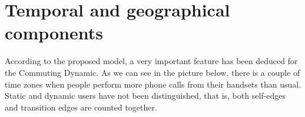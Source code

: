 \newpage

\section{Temporal and geographical components}

According to the proposed model, a very important feature has been deduced for the Commuting Dynamic. As we can see in the picture below, there is a couple of time zones when people perform more phone calls from their handsets than usual. Static and dynamic users have not been distinguished, that is, both self-edges and transition edges are counted together.

\begin{figure}[ht]
\centering
{}
\label{fig:fig1}
\end{figure}

